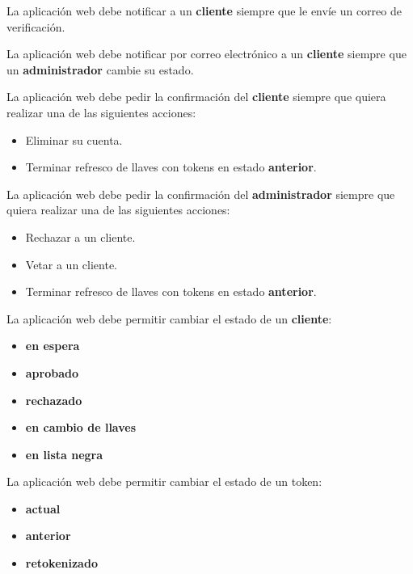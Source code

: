 {
  La aplicación web debe notificar a un \textbf{cliente} siempre que le envíe
  un correo de verificación.
}


{
  La aplicación web debe notificar por correo electrónico a un \textbf{cliente}
  siempre que un \textbf{administrador} cambie su estado.
}

{
  La aplicación web debe pedir la confirmación del \textbf{cliente} siempre que
  quiera realizar una de las siguientes acciones:
  \begin{itemize}
    \item Eliminar su cuenta.
    \item Terminar refresco de llaves con tokens en estado \textbf{anterior}.
  \end{itemize}
}

{
  La aplicación web debe pedir la confirmación del \textbf{administrador}
  siempre que quiera realizar una de las siguientes acciones:
  \begin{itemize}
    \item Rechazar a un cliente.
    \item Vetar a un cliente.
    \item Terminar refresco de llaves con tokens en estado \textbf{anterior}.
  \end{itemize}
}

{
  La aplicación web debe permitir cambiar el estado de un \textbf{cliente}:
  \begin{itemize}
    \item \textbf{en espera}
    \item \textbf{aprobado}
    \item \textbf{rechazado}
    \item \textbf{en cambio de llaves}
    \item \textbf{en lista negra}
  \end{itemize}
}

{
  La aplicación web debe permitir cambiar el estado de un token:
  \begin{itemize}
    \item \textbf{actual}
    \item \textbf{anterior}
    \item \textbf{retokenizado}
  \end{itemize}
}

